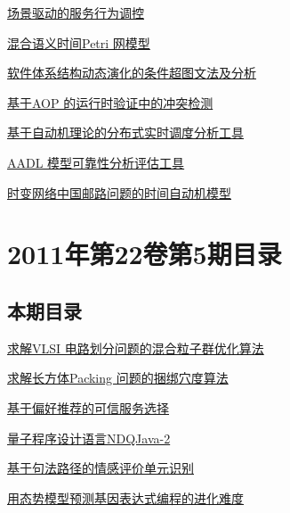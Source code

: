 \documentclass[a4paper]{article}
\begin{document}
\href{http://www.jos.org.cn/ch/reader/download_pdf.aspx?file_no=4019&year_id=2011&quarter_id=6&falg=1}{场景驱动的服务行为调控}

\href{http://www.jos.org.cn/ch/reader/download_pdf.aspx?file_no=4018&year_id=2011&quarter_id=6&falg=1}{混合语义时间Petri 网模型}

\href{http://www.jos.org.cn/ch/reader/download_pdf.aspx?file_no=4017&year_id=2011&quarter_id=6&falg=1}{软件体系结构动态演化的条件超图文法及分析}

\href{http://www.jos.org.cn/ch/reader/download_pdf.aspx?file_no=4016&year_id=2011&quarter_id=6&falg=1}{基于AOP 的运行时验证中的冲突检测}

\href{http://www.jos.org.cn/ch/reader/download_pdf.aspx?file_no=4015&year_id=2011&quarter_id=6&falg=1}{基于自动机理论的分布式实时调度分析工具}

\href{http://www.jos.org.cn/ch/reader/download_pdf.aspx?file_no=4014&year_id=2011&quarter_id=6&falg=1}{AADL 模型可靠性分析评估工具}

\href{http://www.jos.org.cn/ch/reader/download_pdf.aspx?file_no=4033&year_id=2011&quarter_id=6&falg=1}{时变网络中国邮路问题的时间自动机模型}


\section{\textbf{2011年第22卷第5期目录}}
\subsection{本期目录}
\href{http://www.jos.org.cn/ch/reader/download_pdf.aspx?file_no=3980&year_id=2011&quarter_id=5&falg=1}{求解VLSI 电路划分问题的混合粒子群优化算法}

\href{http://www.jos.org.cn/ch/reader/download_pdf.aspx?file_no=3799&year_id=2011&quarter_id=5&falg=1}{求解长方体Packing 问题的捆绑穴度算法}

\href{http://www.jos.org.cn/ch/reader/download_pdf.aspx?file_no=3804&year_id=2011&quarter_id=5&falg=1}{基于偏好推荐的可信服务选择}

\href{http://www.jos.org.cn/ch/reader/download_pdf.aspx?file_no=3979&year_id=2011&quarter_id=5&falg=1}{量子程序设计语言NDQJava-2}

\href{http://www.jos.org.cn/ch/reader/download_pdf.aspx?file_no=3767&year_id=2011&quarter_id=5&falg=1}{基于句法路径的情感评价单元识别}

\href{http://www.jos.org.cn/ch/reader/download_pdf.aspx?file_no=3768&year_id=2011&quarter_id=5&falg=1}{用态势模型预测基因表达式编程的进化难度}
\end{document}
